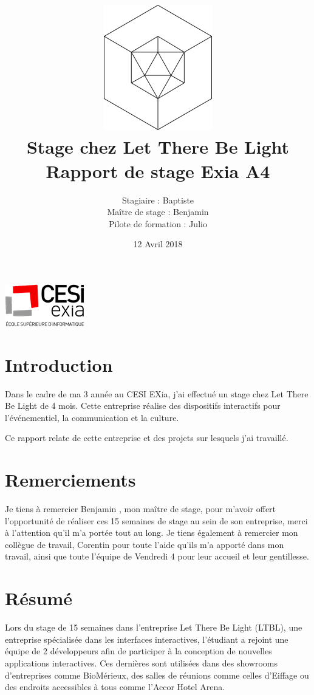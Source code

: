 \documentclass{article}
\title{\includegraphics{img/logo.png}\vspace{2cm}\\
Stage chez Let There Be Light \\
\large Rapport de stage Exia A4}
\date{12 Avril 2018}
\author{Stagiaire : Baptiste \bsc{Saclier} \\
Maître de stage : Benjamin \bsc{Petit}\\
Pilote de formation : Julio \bsc{Santilario}}
\begin{document}
    \maketitle
    \vspace{\fill}
    \hspace{\fill}\includegraphics{img/exia.png}

    \clearpage

    \tableofcontents

    \section{Introduction}

    Dans le cadre de ma 3 année au CESI EXia, j'ai effectué un stage chez Let There Be Light de 4 mois.
    Cette entreprise réalise des dispositifs interactifs pour l'événementiel, la communication et la culture.

    Ce rapport relate de cette entreprise et des projets sur lesquels j'ai travaillé.

    \clearpage

    \section{Remerciements}

    \vspace{\fill}

    Je tiens à remercier Benjamin , mon maître de stage, pour m'avoir offert l'opportunité de réaliser ces 15 semaines de stage au sein de son entreprise, merci à l'attention qu'il m'a portée tout au long.
    Je tiens également à remercier mon collègue de travail, Corentin  pour toute l'aide qu'ils m'a apporté dans mon travail, ainsi que toute l'équipe de Vendredi 4 pour leur accueil et leur gentillesse.

    \vspace{\fill}

    \clearpage

    \section{Résumé}

    Lors du stage de 15 semaines dans l'entreprise Let There Be Light (LTBL), une entreprise spécialisée dans les interfaces interactives, l'étudiant a rejoint une équipe de 2 développeurs afin de participer à la conception de nouvelles applications interactives.
    Ces dernières sont utilisées dans des showrooms d'entreprises comme BioMérieux, des salles de réunions comme celles d'Eiffage ou des endroits accessibles à tous comme l'Accor Hotel Arena.
\end{document}
